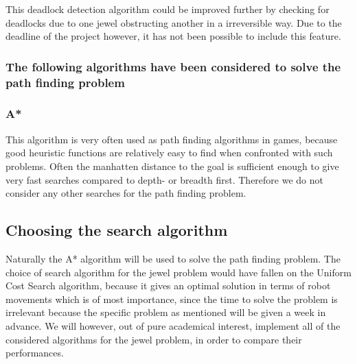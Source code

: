 This deadlock detection algorithm could be improved further by checking for deadlocks due to one jewel obstructing another in a irreversible way. Due to the deadline of the project however, it has not been possible to include this feature.

\subsubsection*{The following algorithms have been considered to solve the path finding problem}
\subsubsection*{A*}
This algorithm is very often used as path finding algorithms in games, because good heuristic functions are relatively easy to find when confronted with such problems. Often the manhatten distance to the goal is sufficient enough to give very fast searches compared to depth- or breadth first. Therefore we do not consider any other searches for the path finding problem.

\subsection{Choosing the search algorithm}
Naturally the A* algorithm will be used to solve the path finding problem. The choice of search algorithm for the jewel problem would have fallen on the Uniform Cost Search algorithm, because it gives an optimal solution in terms of robot movements which is of most importance, since the time to solve the problem is irrelevant because the specific problem as mentioned will be given a week in advance. We will however, out of pure academical interest, implement all of the considered algorithms for the jewel problem, in order to compare their performances. 
